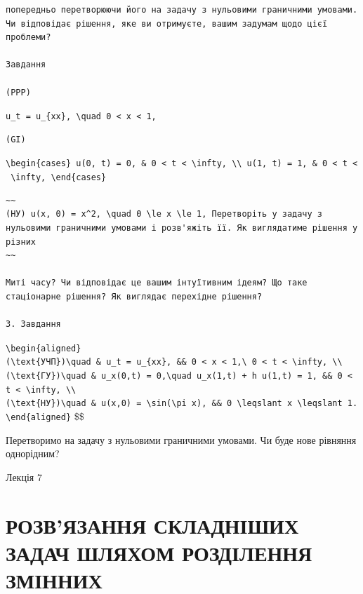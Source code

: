 \documentclass[
  ukrainian,
]{article}
\begin{document}
\begin{verbatim}
попередньо перетворюючи його на задачу з нульовими граничними умовами. Чи відповідає рішення, яке ви отримуєте, вашим задумам щодо цієї проблеми?

Завдання

(PPP)
\end{verbatim}

\texttt{u\_t\ =\ u\_\{xx\},\ \textbackslash{}quad\ 0\ \textless{}\ x\ \textless{}\ 1,}

\begin{verbatim}
(GI)
\end{verbatim}

\texttt{\textbackslash{}begin\{cases\}\ u(0,\ t)\ =\ 0,\ \&\ 0\ \textless{}\ t\ \textless{}\ \textbackslash{}infty,\ \textbackslash{}\textbackslash{}\ u(1,\ t)\ =\ 1,\ \&\ 0\ \textless{}\ t\ \textless{}\ \textbackslash{}infty,\ \textbackslash{}end\{cases\}}

\begin{verbatim}
~~
(НУ) u(x, 0) = x^2, \quad 0 \le x \le 1, Перетворіть у задачу з нульовими граничними умовами і розв'яжіть її. Як виглядатиме рішення у різних
~~

Миті часу? Чи відповідає це вашим інтуїтивним ідеям? Що таке стаціонарне рішення? Як виглядає перехідне рішення?

3. Завдання
\end{verbatim}

\texttt{\textbackslash{}begin\{aligned\}}
\texttt{(\textbackslash{}text\{УЧП\})\textbackslash{}quad\ \&\ u\_t\ =\ u\_\{xx\},\ \&\&\ 0\ \textless{}\ x\ \textless{}\ 1,\textbackslash{}\ 0\ \textless{}\ t\ \textless{}\ \textbackslash{}infty,\ \textbackslash{}\textbackslash{}}
\texttt{(\textbackslash{}text\{ГУ\})\textbackslash{}quad\ \&\ u\_x(0,t)\ =\ 0,\textbackslash{}quad\ u\_x(1,t)\ +\ h\ u(1,t)\ =\ 1,\ \&\&\ 0\ \textless{}\ t\ \textless{}\ \textbackslash{}infty,\ \textbackslash{}\textbackslash{}}
\texttt{(\textbackslash{}text\{НУ\})\textbackslash{}quad\ \&\ u(x,0)\ =\ \textbackslash{}sin(\textbackslash{}pi\ x),\ \&\&\ 0\ \textbackslash{}leqslant\ x\ \textbackslash{}leqslant\ 1.}
\texttt{\textbackslash{}end\{aligned\}} \$\$

Перетворимо на задачу з нульовими граничними умовами. Чи буде нове
рівняння однорідним?

Лекція 7

\section{РОЗВ'ЯЗАННЯ СКЛАДНІШИХ ЗАДАЧ ШЛЯХОМ РОЗДІЛЕННЯ
ЗМІННИХ}\label{ux440ux43eux437ux432ux44fux437ux430ux43dux43dux44f-ux441ux43aux43bux430ux434ux43dux456ux448ux438ux445-ux437ux430ux434ux430ux447-ux448ux43bux44fux445ux43eux43c-ux440ux43eux437ux434ux456ux43bux435ux43dux43dux44f-ux437ux43cux456ux43dux43dux438ux445}
\end{document}

